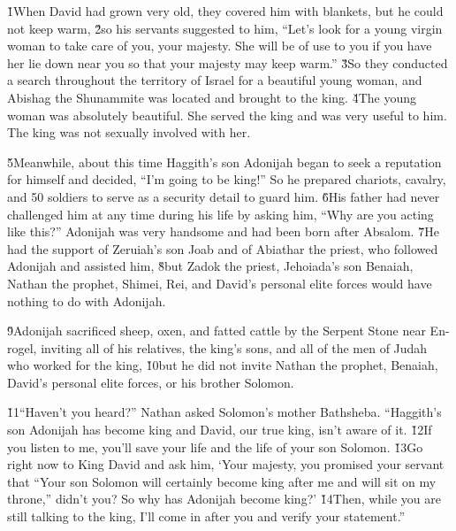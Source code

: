 


\v{1}When David had grown very old, they covered him with blankets, but he could not keep warm, \v{2}so his servants suggested to him, ``Let's look for a young virgin woman to take care of you, your majesty. She will be of use to you if you have her lie down near you so that your majesty may keep warm.'' \v{3}So they conducted a search throughout the territory of Israel for a beautiful young woman, and Abishag the Shunammite was located and brought to the king. \v{4}The young woman was absolutely beautiful. She served the king and was very useful to him. The king was not sexually involved with her.

\v{5}Meanwhile, about this time Haggith's son Adonijah began to seek a reputation for himself and decided, ``I'm going to be king!'' So he prepared chariots, cavalry, and 50 soldiers to serve as a security detail to guard him. \v{6}His father had never challenged him at any time during his life by asking him, ``Why are you acting like this?'' Adonijah was very handsome and had been born after Absalom. \v{7}He had the support of Zeruiah's son Joab and of Abiathar the priest, who followed Adonijah and assisted him, \v{8}but Zadok the priest, Jehoiada's son Benaiah, Nathan the prophet, Shimei, Rei, and David's personal elite forces would have nothing to do with Adonijah.

\v{9}Adonijah sacrificed sheep, oxen, and fatted cattle by the Serpent Stone near En-rogel, inviting all of his relatives, the king's sons, and all of the men of Judah who worked for the king, \v{10}but he did not invite Nathan the prophet, Benaiah, David's personal elite forces, or his brother Solomon.

\v{11}``Haven't you heard?'' Nathan asked Solomon's mother Bathsheba. ``Haggith's son Adonijah has become king and David, our true king, isn't aware of it. \v{12}If you listen to me, you'll save your life and the life of your son Solomon. \v{13}Go right now to King David and ask him, `Your majesty, you promised your servant that ``Your son Solomon will certainly become king after me and will sit on my throne,'' didn't you? So why has Adonijah become king?' \v{14}Then, while you are still talking to the king, I'll come in after you and verify your statement.''

